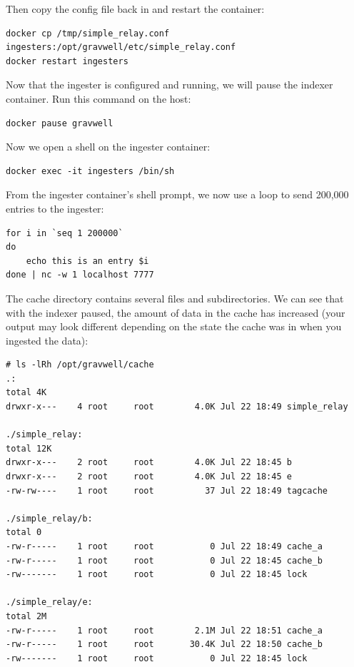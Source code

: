 
Then copy the config file back in and restart the container:

\begin{Verbatim}[breaklines=true]
docker cp /tmp/simple_relay.conf ingesters:/opt/gravwell/etc/simple_relay.conf
docker restart ingesters
\end{Verbatim}

Now that the ingester is configured and running, we will pause the indexer container.
Run this command on the host:

\begin{Verbatim}[breaklines=true]
docker pause gravwell
\end{Verbatim}

Now we open a shell on the ingester container:

\begin{Verbatim}[breaklines=true]
docker exec -it ingesters /bin/sh
\end{Verbatim}

From the ingester container's shell prompt, we now use a loop to
send 200,000 entries to the ingester:

\begin{Verbatim}[breaklines=true]
for i in `seq 1 200000`
do
	echo this is an entry $i
done | nc -w 1 localhost 7777
\end{Verbatim}

{The cache directory contains several files and subdirectories. We can see that
with the indexer paused, the amount of data in the cache has increased (your
output may look different depending on the state the cache was in when you
ingested the data):}

\begin{Verbatim}[breaklines=true]
# ls -lRh /opt/gravwell/cache
.:
total 4K     
drwxr-x---    4 root     root        4.0K Jul 22 18:49 simple_relay

./simple_relay:
total 12K    
drwxr-x---    2 root     root        4.0K Jul 22 18:45 b
drwxr-x---    2 root     root        4.0K Jul 22 18:45 e
-rw-rw----    1 root     root          37 Jul 22 18:49 tagcache

./simple_relay/b:
total 0      
-rw-r-----    1 root     root           0 Jul 22 18:49 cache_a
-rw-r-----    1 root     root           0 Jul 22 18:45 cache_b
-rw-------    1 root     root           0 Jul 22 18:45 lock

./simple_relay/e:
total 2M     
-rw-r-----    1 root     root        2.1M Jul 22 18:51 cache_a
-rw-r-----    1 root     root       30.4K Jul 22 18:50 cache_b
-rw-------    1 root     root           0 Jul 22 18:45 lock
\end{Verbatim}

